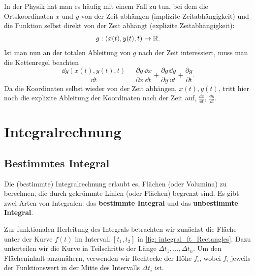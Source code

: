 In der Physik hat man es häufig mit einem Fall zu tun, bei dem die Ortskoordinaten $x$ und $y$ von der Zeit abhängen (implizite Zeitabhängigkeit) und die Funktion selbst direkt von der Zeit abhängt (explizite Zeitabhängigkeit):
\begin{equation}
    g: (x(t), y(t), t) \to \mathbb{R}.    
\end{equation}
Ist man nun an der totalen Ableitung von $g$ nach der Zeit interessiert, muss man die Kettenregel beachten
\begin{equation}
    \frac{\dd g(x(t), y(t), t)}{\dd t} = \frac{\partial g}{\partial x}\frac{\dd x}{\dd t} + \frac{\partial g}{\partial y}\frac{\dd y}{\dd t} + \frac{\partial g}{\partial t}.
\end{equation}
Da die Koordinaten selbst wieder von der Zeit abhängen, $x(t), y(t)$, tritt hier noch die explizite Ableitung der Koordinaten nach der Zeit auf, $\frac{\dd x}{\dd t}$, $\frac{\dd y}{\dd t}$.


\newpage
\chapter{Integralrechnung}\label{chap: Integralrechnung}
\section{Bestimmtes Integral}\label{sec: Bestimmtes_Integral}
Die (bestimmte) Integralrechnung erlaubt es, Flächen (oder Volumina) zu berechnen, die durch gekrümmte Linien (oder Flächen) begrenzt sind. Es gibt zwei Arten von Integralen: das \textbf{bestimmte Integral} und das \textbf{unbestimmte Integral}.

Zur funktionalen Herleitung des Integrals betrachten wir zunächst die Fläche unter der Kurve $f(t)$ im Intervall $[t_{1},t_{2}]$ in \cref{fig: integral_ft_Rectangles}. Dazu unterteilen wir die Kurve in Teilschritte der Länge $\Delta t_{1},\dots,\Delta t_{n}$. Um den Flächeninhalt anzunähern, verwenden wir Rechtecke der Höhe $f_{i}$, wobei $f_{i}$ jeweils der Funktionswert in der Mitte des Intervalls $\Delta t_i$ ist.


